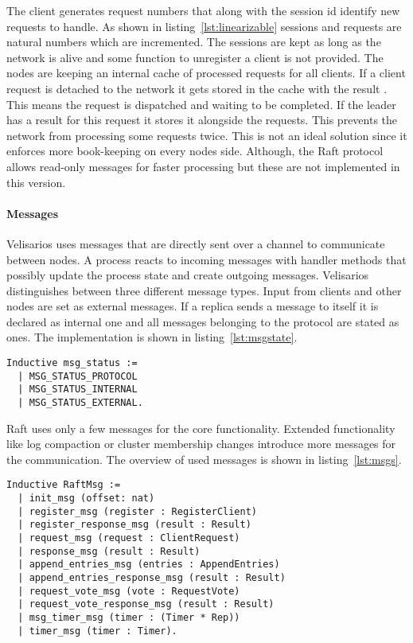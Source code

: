 The client generates request numbers that along with the session id identify
new requests to handle. As shown in listing~\ref{lst:linearizable} sessions
and requests are natural numbers which are incremented.  The sessions are kept as
long as the network is alive and some function to unregister a client
is not provided. The nodes are keeping an internal cache of processed
requests for all clients. If a client request is detached to the network
it gets stored in the cache with the result . This means
the request is dispatched and waiting to be completed. If the leader
has a result for this request it stores it alongside the requests. 
This prevents the network from processing some requests twice.
This is not an ideal solution since it enforces more book-keeping on every nodes
side. Although, the Raft protocol allows read-only messages for faster
processing but these are not implemented in this version. 

\paragraph{Messages}
Velisarios uses messages that are directly sent over a channel to communicate
between nodes. A process reacts to incoming messages with handler methods that
possibly update the process state and create outgoing messages. Velisarios
distinguishes between three different message types. Input from clients
and other nodes are set as external messages. If a replica sends a message
to itself it is declared as internal one and all messages belonging to the
protocol are stated as ones. The implementation is shown in listing~\ref{lst:msgstate}.

\begin{lstlisting}[style=coq,label=lst:msgstate,
caption=Messages have different state informations which are handled by Velisarios.]
  Inductive msg_status :=
  | MSG_STATUS_PROTOCOL
  | MSG_STATUS_INTERNAL
  | MSG_STATUS_EXTERNAL.
\end{lstlisting}

Raft uses only a few messages for the core functionality. Extended functionality
like log compaction or cluster membership changes introduce more messages for
the communication. The overview of used messages is shown in listing~\ref{lst:msgs}.

\begin{lstlisting}[style=coq,label=lst:msgs,
caption=Overview of the different messages needed for the core Raft.]
 Inductive RaftMsg :=
  | init_msg (offset: nat)
  | register_msg (register : RegisterClient)
  | register_response_msg (result : Result)
  | request_msg (request : ClientRequest)
  | response_msg (result : Result)
  | append_entries_msg (entries : AppendEntries)
  | append_entries_response_msg (result : Result)
  | request_vote_msg (vote : RequestVote)
  | request_vote_response_msg (result : Result)
  | msg_timer_msg (timer : (Timer * Rep))
  | timer_msg (timer : Timer).
\end{lstlisting}

